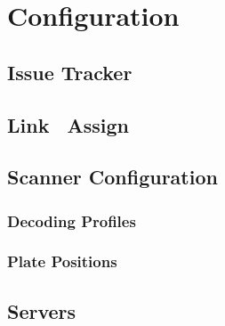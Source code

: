 \chapter{Configuration}
\section{Issue Tracker}
\section{Link \ Assign}
\section{Scanner Configuration}
\subsection{Decoding Profiles}
\subsection{Plate Positions}
\section{Servers}
